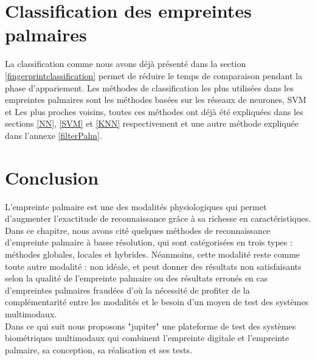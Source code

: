 \section{Classification des empreintes palmaires}
La classification comme nous avons déjà présenté dans la section \ref{fingerprintclassification} permet de réduire le temps de comparaison pendant la phase d'appariement. Les méthodes de classification les plus utilisées dans les empreintes palmaires sont les méthodes basées sur les réseaux de neurones, SVM et Les plus proches voisins, toutes ces méthodes ont déjà été expliquées dans les sections \ref{NN}, \ref{SVM} et \ref{KNN} respectivement et une autre méthode expliquée dans l'annexe \ref{filterPalm}.
\section{Conclusion} 
L'empreinte palmaire est une des modalités physiologiques qui permet d'augmenter l'exactitude de reconnaissance grâce à sa richesse en caractéristiques. Dans ce chapitre, nous avons cité quelques méthodes de reconnaissance d'empreinte palmaire à basse résolution, qui sont catégorisées en trois types : méthodes globales, locales et hybrides. Néanmoins, cette modalité reste comme toute autre modalité : non idéale, et peut donner des résultats non satisfaisants selon la qualité de l'empreinte palmaire ou des résultats erronés en cas d'empreintes palmaires fraudées d'où la nécessité de profiter de la complémentarité entre les modalités et le besoin d'un moyen de test des systèmes multimodaux. 
\\
Dans ce qui suit nous proposons "jupiter" une plateforme de test des systèmes biométriques multimodaux qui combinent l'empreinte digitale et l'empreinte palmaire, sa conception, sa réalisation et ses tests.
